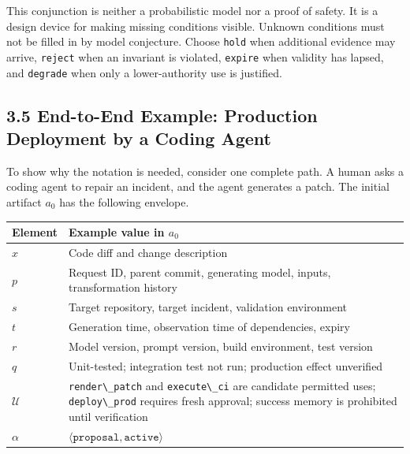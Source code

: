 This conjunction is neither a probabilistic model nor a proof of safety. It is a design device for making missing conditions visible. Unknown conditions must not be filled in by model conjecture. Choose \passthrough{\lstinline!hold!} when additional evidence may arrive, \passthrough{\lstinline!reject!} when an invariant is violated, \passthrough{\lstinline!expire!} when validity has lapsed, and \passthrough{\lstinline!degrade!} when only a lower-authority use is justified.

\subsection{3.5 End-to-End Example: Production Deployment by a Coding Agent}\label{end-to-end-example-production-deployment-by-a-coding-agent}

To show why the notation is needed, consider one complete path. A human asks a coding agent to repair an incident, and the agent generates a patch. The initial artifact \(a_0\) has the following envelope.

{\def\LTcaptype{none} %
\begin{longtable}[]{@{}
  >{\raggedright\arraybackslash}p{}
  >{\raggedright\arraybackslash}p{}@{}}
\toprule\noalign{}
\begin{minipage}[b]{\linewidth}\raggedright
Element
\end{minipage} & \begin{minipage}[b]{\linewidth}\raggedright
Example value in \(a_0\)
\end{minipage} \\
\midrule\noalign{}
\endhead
\bottomrule\noalign{}
\endlastfoot
\(x\) & Code diff and change description \\
\(p\) & Request ID, parent commit, generating model, inputs, transformation history \\
\(s\) & Target repository, target incident, validation environment \\
\(t\) & Generation time, observation time of dependencies, expiry \\
\(r\) & Model version, prompt version, build environment, test version \\
\(q\) & Unit-tested; integration test not run; production effect unverified \\
\(\mathcal U\) & \passthrough{\lstinline!render\_patch!} and \passthrough{\lstinline!execute\_ci!} are candidate permitted uses; \passthrough{\lstinline!deploy\_prod!} requires fresh approval; success memory is prohibited until verification \\
\(\alpha\) & \(\langle\texttt{proposal},\texttt{active}\rangle\) \\
\end{longtable}
}

